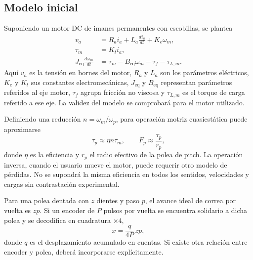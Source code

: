 \documentclass[11pt,a4paper]{article}
\begin{document}
\subsection{Modelo inicial}
Suponiendo un motor DC de imanes permanentes con escobillas, se plantea
\begin{align}
    v_a &= R_a i_a + L_a\frac{di_a}{dt}+K_e\omega_m,\\
    \tau_m &= K_t i_a,\\
    J_{\mathrm{eq}}\frac{d\omega_m}{dt}
        &= \tau_m-B_{\mathrm{eq}}\omega_m-\tau_f-\tau_{L,m}.
\end{align}
Aquí $v_a$ es la tensión en bornes del motor, $R_a$ y $L_a$ son los parámetros
eléctricos, $K_e$ y $K_t$ sus constantes electromecánicas,
$J_{\mathrm{eq}}$ y $B_{\mathrm{eq}}$ representan parámetros referidos al eje
motor, $\tau_f$ agrupa fricción no viscosa y $\tau_{L,m}$ es el torque de carga
referido a ese eje. La validez del modelo se comprobará para el motor utilizado.

Definiendo una reducción $n=\omega_m/\omega_p$, para operación motriz
cuasiestática puede aproximarse
\begin{equation}
    \tau_p \approx \eta n\tau_m,
    \qquad
    F_p\approx\frac{\tau_p}{r_p},
\end{equation}
donde $\eta$ es la eficiencia y $r_p$ el radio efectivo de la polea de pitch.
La operación inversa, cuando el usuario mueve el motor, puede requerir
otro modelo de pérdidas. No se supondrá la misma eficiencia en todos los
sentidos, velocidades y cargas sin contrastación experimental.

Para una polea dentada con $z$ dientes y paso $p$, el avance ideal de correa
por vuelta es $zp$. Si un encoder de $P$ pulsos por vuelta se encuentra
solidario a dicha polea y se decodifica en cuadratura $\times4$,
\begin{equation}
    x=\frac{q}{4P}\,zp,
\end{equation}
donde $q$ es el desplazamiento acumulado en cuentas. Si existe otra relación
entre encoder y polea, deberá incorporarse explícitamente.
\end{document}
